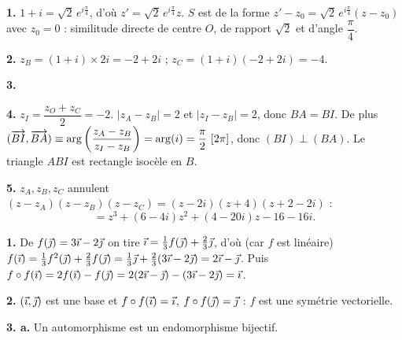 \documentclass[11pt]{article}
\begin{document}

\textbf{1.} $1 + i = \sqrt{2}\,e^{i\frac{\pi}{4}}$, d'où $z' = \sqrt{2}\,e^{i\frac{\pi}{4}}z$. $S$ est de la forme $z' - z_0 = \sqrt{2}\,e^{i\frac{\pi}{4}}(z - z_0)$ avec $z_0 = 0$ : similitude directe de centre $O$, de rapport $\sqrt{2}$ et d'angle $\dfrac{\pi}{4}$.

\textbf{2.} $z_B = (1+i)\times 2i = -2 + 2i$ ; \quad $z_C = (1+i)(-2 + 2i) = -4$.

\textbf{3.}
\begin{center}
\end{center}

\textbf{4.} $z_I = \dfrac{z_O + z_C}{2} = -2$. $|z_A - z_B| = 2$ et $|z_I - z_B| = 2$, donc $BA = BI$. De plus $(\overrightarrow{BI}, \overrightarrow{BA}) \equiv \arg\left(\dfrac{z_A - z_B}{z_I - z_B}\right) = \arg(i) = \dfrac{\pi}{2}\ [2\pi]$, donc $(BI) \perp (BA)$. Le triangle $ABI$ est rectangle isocèle en $B$.

\textbf{5.} $z_A, z_B, z_C$ annulent $(z - z_A)(z - z_B)(z - z_C) = (z - 2i)(z + 4)(z + 2 - 2i)$ :
\[ = z^3 + (6 - 4i)z^2 + (4 - 20i)z - 16 - 16i. \]

\textbf{1.} De $f(\vec{\jmath}) = 3\vec{\imath} - 2\vec{\jmath}$ on tire $\vec{\imath} = \tfrac{1}{3}f(\vec{\jmath}) + \tfrac{2}{3}\vec{\jmath}$, d'où (car $f$ est linéaire) $f(\vec{\imath}) = \tfrac{1}{3}f^2(\vec{\jmath}) + \tfrac{2}{3}f(\vec{\jmath}) = \tfrac{1}{3}\vec{\jmath} + \tfrac{2}{3}(3\vec{\imath} - 2\vec{\jmath}) = 2\vec{\imath} - \vec{\jmath}$. Puis $f\circ f(\vec{\imath}) = 2f(\vec{\imath}) - f(\vec{\jmath}) = 2(2\vec{\imath} - \vec{\jmath}) - (3\vec{\imath} - 2\vec{\jmath}) = \vec{\imath}$.

\textbf{2.} $(\vec{\imath}, \vec{\jmath})$ est une base et $f\circ f(\vec{\imath}) = \vec{\imath}$, $f\circ f(\vec{\jmath}) = \vec{\jmath}$ : $f$ est une symétrie vectorielle.

\textbf{3. a.} Un automorphisme est un endomorphisme bijectif.
\end{document}
